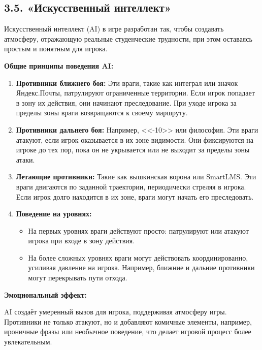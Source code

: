 \subsection*{3.5. «Искусственный интеллект»}

Искусственный интеллект (AI) в игре разработан так, чтобы создавать атмосферу, отражающую реальные студенческие трудности, при этом оставаясь простым и понятным для игрока.

\textbf{Общие принципы поведения AI:}

\begin{enumerate}
    \item \textbf{Противники ближнего боя:}  
    Эти враги, такие как интеграл или значок Яндекс.Почты, патрулируют ограниченные территории. Если игрок попадает в зону их действия, они начинают преследование. При уходе игрока за пределы зоны враги возвращаются к своему маршруту.  

    \item \textbf{Противники дальнего боя:}  
    Например, <<-10>> или философия. Эти враги атакуют, если игрок оказывается в их зоне видимости. Они фиксируются на игроке до тех пор, пока он не укрывается или не выходит за пределы зоны атаки.  

    \item \textbf{Летающие противники:}  
    Такие как вышкинская ворона или SmartLMS. Эти враги двигаются по заданной траектории, периодически стреляя в игрока. Если игрок долго находится в их зоне, враги могут начать его преследовать.  

    \item \textbf{Поведение на уровнях:}  
    \begin{itemize}
        \item На первых уровнях враги действуют просто: патрулируют или атакуют игрока при входе в зону действия.  
        \item На более сложных уровнях враги могут действовать координированно, усиливая давление на игрока. Например, ближние и дальние противники могут перекрывать пути отхода.  
    \end{itemize}
\end{enumerate}

\textbf{Эмоциональный эффект:}

AI создаёт умеренный вызов для игрока, поддерживая атмосферу игры. Противники не только атакуют, но и добавляют комичные элементы, например, ироничные фразы или необычное поведение, что делает игровой процесс более увлекательным.

